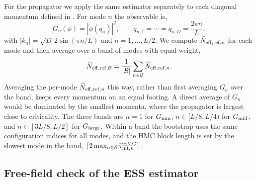 \documentclass[reprint,twocolumn,superscriptaddress,preprintnumbers,amsmath,amssymb,aps,prd,floatfix]{revtex4-2}
\begin{document}
For the propagator we apply the same estimator separately to each diagonal momentum defined in . For mode $n$ the observable is,
\begin{equation}
G_n(\phi)=|\widetilde\phi(q_n)|^2,
\qquad
q_{n,1}=\cdots=q_{n,D}=\frac{2\pi n}{L},
\end{equation}
with $|k_n|=\sqrt{D}\,2\sin(\pi n/L)$ and $n=1,\ldots,L/2$. We compute $\widehat N_{{\rm eff,ref},n}$ for each mode and then average over a band of modes with equal weight,
\begin{equation}
\widehat N_{{\rm eff,ref},{\cal B}}=\frac{1}{|{\cal B}|}\sum_{n\in{\cal B}}\widehat N_{{\rm eff,ref},n} .
\end{equation}
Averaging the per-mode $\widehat N_{{\rm eff,ref},n}$ this way, rather than first averaging $G_n$ over the band, keeps every momentum on an equal footing. A direct average of $G_n$ would be dominated by the smallest momenta, where the propagator is largest close to criticality. The three bands are $n=1$ for $G_{\rm min}$, $n\in[L/8,L/4)$ for $G_{\rm mid}$, and $n\in[3L/8,L/2]$ for $G_{\rm large}$. Within a band the bootstrap uses the same configuration indices for all modes, and the HMC block length is set by the slowest mode in the band, $\lceil 2\max_{n\in{\cal B}}\widehat\tau_{{\rm int},n}^{\rm HMC}\rceil$.

\subsection{Free-field check of the ESS estimator}
\label{app:ess_free_field}
\end{document}
